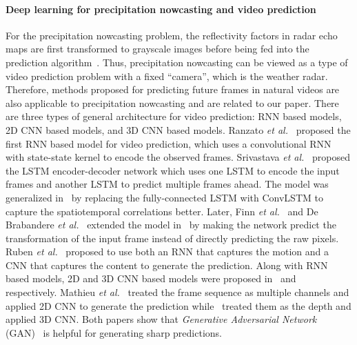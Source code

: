 \documentclass{article}
\begin{document}
\paragraph{Deep learning for precipitation nowcasting and video prediction}
For the precipitation nowcasting problem, the reflectivity factors in radar echo maps are first transformed to grayscale images before being fed into the prediction algorithm~\cite{xingjian2015convolutional}. Thus, precipitation nowcasting can be viewed as a type of video prediction problem with a fixed ``camera'', which is the weather radar. Therefore, methods proposed for predicting future frames in natural videos are also applicable to precipitation nowcasting and are related to our paper. There are three types of general architecture for video prediction: RNN based models, 2D CNN based models, and 3D CNN based models. Ranzato \emph{et al.}~\cite{ranzato2014video} proposed the first RNN based model for video prediction, which uses a convolutional RNN with  state-state kernel to encode the observed frames. Srivastava \emph{et al.}~\cite{srivastava2015unsupervised} proposed the LSTM encoder-decoder network which uses one LSTM to encode the input frames and another LSTM to predict multiple frames ahead. The model was generalized in~\cite{xingjian2015convolutional} by replacing the fully-connected LSTM with ConvLSTM to capture the spatiotemporal correlations better. Later, Finn \emph{et al.}~\cite{finn2016unsupervised} and De Brabandere \emph{et al.}~\cite{de2016dynamic} extended the model in~\cite{xingjian2015convolutional} by making the network predict the transformation of the input frame instead of directly predicting the raw pixels. Ruben \emph{et al.}~\cite{villegas2017decomposing} proposed to use both an RNN that captures the motion and a CNN that captures the content to generate the prediction. Along with RNN based models, 2D and 3D CNN based models were proposed in~\cite{mathieu2015deep} and~\cite{vondrick2016generating} respectively. Mathieu \emph{et al.}~\cite{mathieu2015deep} treated the frame sequence as multiple channels and applied 2D CNN to generate the prediction while~\cite{vondrick2016generating} treated them as the depth and applied 3D CNN. Both papers show that \emph{Generative Adversarial Network} (GAN)~\cite{goodfellow2014generative} is helpful for generating sharp predictions.
\vspace{-0.8em}
\end{document}
